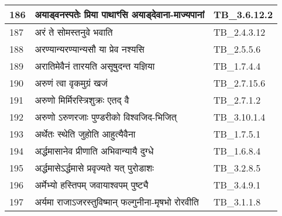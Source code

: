 \documentclass[17pt]{extarticle}
\begin{document}
\begin{longtable}{||p{0.4in}||p{4.9in}||p{0.9in}||}
    \hline
        
    186 & अयाड्वनस्पतेः प्रिया पाथाꣳसि अयाड्देवाना{-}माज्यपानां & TB\_3.6.12.2       \\
    
    \hline
        
    187 & अरं ते सोमस्तनुवे भवाति & TB\_2.4.3.12       \\
    
    \hline
        
    188 & अरण्यान्यरण्यान्यसौ या प्रेव नश्यसि & TB\_2.5.5.6       \\
    
    \hline
        
    189 & अरातिमेवैनं तारयति असूषुदन्त यज्ञिया & TB\_1.7.4.4       \\
    
    \hline
        
    190 & अरुणं त्वा वृकमुग्रं खजं & TB\_2.7.15.6       \\
    
    \hline
        
    191 & अरुणो मिर्मिरस्त्रिशुक्रः एतद् वै & TB\_2.7.1.2       \\
    
    \hline
        
    192 & अरुणो ऽरुणरजाः पुण्डरीको विश्वजिद{-}भिजित् & TB\_3.10.1.4       \\
    
    \hline
        
    193 & अर्थेतः स्थेति जुहोति आहुत्यैवैना & TB\_1.7.5.1       \\
    
    \hline
        
    194 & अर्द्धमासानेव प्रीणाति अभिवान्यायै दुग्धे & TB\_1.6.8.4       \\
    
    \hline
        
    195 & अर्द्धमासेऽर्द्धमासे प्रवृज्यते यत् पुरोडाशः & TB\_3.2.8.5       \\
    
    \hline
        
    196 & अर्मेभ्यो हस्तिपम् जवायाश्वपम् पुष्ट्यै & TB\_3.4.9.1       \\
    
    \hline
        
    197 & अर्यमा राजाऽजरस्तुविष्मान् फल्गुनीना{-}मृषभो रोरवीति & TB\_3.1.1.8       \\
    

\end{longtable}
\end{document}
